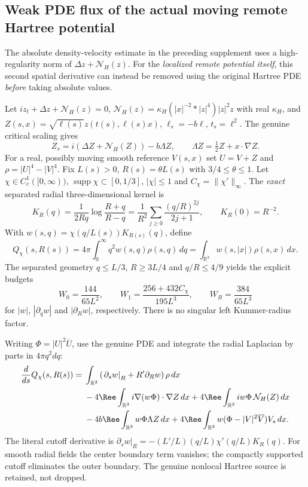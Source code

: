
\subsection*{Weak PDE flux of the actual moving remote Hartree potential}

\noindent
The absolute density-velocity estimate in the preceding supplement
uses a high-regularity norm of $\Delta z+\mathcal N_H(z)$.
For the \emph{localized remote potential itself}, this second
spatial derivative can instead be removed using the original
Hartree PDE \emph{before} taking absolute values.

Let $iz_t+\Delta z+\mathcal N_H(z)=0$,
$\mathcal N_H(z)=\kappa_H(|x|^{-2}*|z|^4)|z|^2z$ with real
$\kappa_H$, and
$Z(s,x)=\sqrt{\ell(s)}z(t(s),\ell(s)x)$,
$\ell_s=-b\ell$, $t_s=\ell^2$. The genuine critical scaling gives
\[
 Z_s=i(\Delta Z+\mathcal N_H(Z))
       -b\Lambda Z,\qquad
 \Lambda Z=\tfrac12Z+x\cdot\nabla Z.
\]
For a real, possibly moving smooth reference $V(s,x)$ set
$U=V+Z$ and $\rho=|U|^4-|V|^4$.
Fix $L(s)>0$, $R(s)=\theta L(s)$ with
$3/4\le\theta\le1$. Let $\chi\in C_c^1([0,\infty))$,
$\operatorname{supp}\chi\subset[0,1/3]$, $|\chi|\le1$ and
$C_\chi=\|\chi'\|_\infty$. The \emph{exact} separated radial
three-dimensional kernel is
\[
 K_R(q)=\frac{1}{2Rq}\log\frac{R+q}{R-q}
 =\frac1{R^2}\sum_{j\ge0}\frac{(q/R)^{2j}}{2j+1},
 \qquad K_R(0)=R^{-2}.
\]
With $w(s,q)=\chi(q/L(s))K_{R(s)}(q)$, define
\[
 Q_\chi(s,R(s))=
 4\pi\int_0^\infty q^2w(s,q)\rho(s,q)\,dq
 =\int_{\mathbb R^3}w(s,|x|)\rho(s,x)\,dx.
\]
The separated geometry $q\le L/3$, $R\ge3L/4$
and $q/R\le4/9$ yields the explicit budgets
\[
 W_0=\frac{144}{65L^2},\qquad
 W_1=\frac{256+432C_\chi}{195L^3},\qquad
 W_R=\frac{384}{65L^3}
\]
for $|w|$, $|\partial_qw|$ and
$|\partial_Rw|$, respectively.
There is no singular left Kummer-radius factor.

Writing $\Phi=|U|^2\overline U$, use the genuine PDE and
integrate the radial Laplacian by parts in $4\pi q^2dq$:
\begin{align*}
 \frac d{ds}Q_\chi(s,R(s))
 ={}&
 \int_{\mathbb R^3}
   \left(\left.\partial_sw\right|_R+
     R'\partial_Rw\right)\rho\,dx\\
 &-4\Ree\int_{\mathbb R^3}
      i\nabla(w\Phi)\cdot\nabla Z\,dx
  +4\Ree\int_{\mathbb R^3}
      iw\Phi\,\mathcal N_H(Z)\,dx\\
 &-4b\Ree\int_{\mathbb R^3}w\Phi\Lambda Z\,dx
  +4\Ree\int_{\mathbb R^3}
       w(\Phi-|V|^2\overline V)V_s\,dx .
\end{align*}
The literal cutoff derivative is
$\left.\partial_sw\right|_R
 =-(L'/L)(q/L)\chi'(q/L)K_R(q)$.
For smooth radial fields the center boundary term vanishes;
the compactly supported cutoff eliminates the outer boundary.
The genuine nonlocal Hartree source is retained, not dropped.

